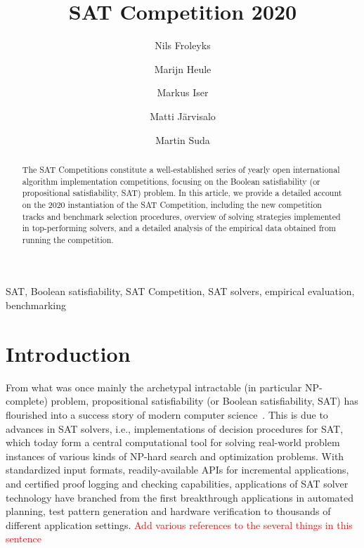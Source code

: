 \documentclass{elsarticle}
\title{SAT Competition 2020\tnoteref{title}}
\author[jku]{Nils Froleyks}
\author[cmu]{Marijn Heule}
\author[kit]{Markus Iser}
\author[uh]{Matti J\"arvisalo}
\author[ctu]{Martin Suda}
\begin{document}
\begin{abstract}
The SAT Competitions constitute a well-established series of yearly open international algorithm implementation competitions,
focusing on the Boolean satisfiability (or propositional satisfiability, SAT) problem. 
In this article, we provide
a detailed account on the 2020 instantiation of the SAT Competition, including the 
 new competition tracks and benchmark selection procedures, overview of solving strategies implemented in top-performing solvers, 
and a detailed analysis of the empirical data obtained from running the competition.
\end{abstract}

\begin{keyword}
SAT, Boolean satisfiability, SAT Competition, SAT solvers, empirical evaluation,
benchmarking
\end{keyword}

\maketitle



\section{Introduction}


From what was once mainly the archetypal intractable (in particular NP-complete) problem, propositional satisfiability 
(or Boolean satisfiability, SAT) has flourished into a success story of modern computer science~\cite{DBLP:series/faia/2009-185}.
This is due to advances in SAT solvers, i.e., implementations of decision procedures for SAT, which today form a 
central computational tool for solving real-world problem instances of various kinds of NP-hard search and optimization problems.
With standardized input formats, readily-available APIs for incremental applications,
and certified proof logging and checking capabilities, applications of SAT solver technology
have branched from the first breakthrough applications in automated planning, test pattern generation and hardware verification
to thousands of different application settings. \textcolor{red}{Add various references to the several things in this sentence}
\end{document}
